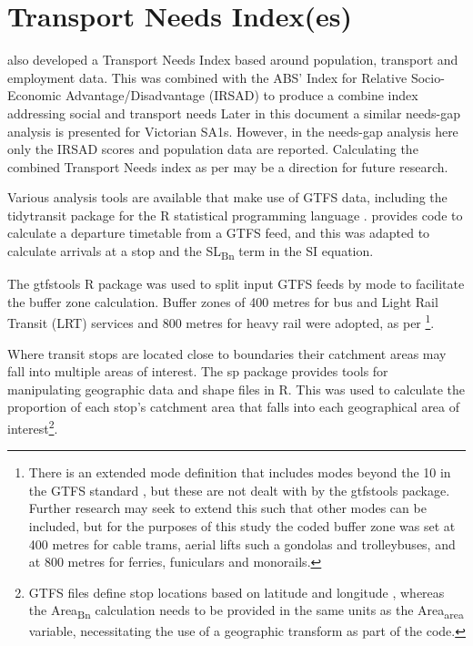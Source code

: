\documentclass[]{tufte-book}
\begin{document}
\hypertarget{transport-needs-indexes}{%
\section{Transport Needs Index(es)}\label{transport-needs-indexes}}

\citet{currie2007identifying} also developed a Transport Needs Index
based around population, transport and employment data. This was
combined with the ABS' Index for Relative Socio-Economic
Advantage/Disadvantage (IRSAD) to produce a combine index addressing
social and transport needs Later in this document a similar needs-gap
analysis is presented for Victorian SA1s. However, in the needs-gap
analysis here only the IRSAD scores and population data are reported.
Calculating the combined Transport Needs index as per
\citet{currie2007identifying} may be a direction for future research.

Various analysis tools are available that make use of GTFS data,
including the tidytransit package \citep{R-tidytransit} for the R
statistical programming language \citep{R-base}.
\citet{tidytransit_departure_timetable} provides code to calculate a
departure timetable from a GTFS feed, and this was adapted to calculate
arrivals at a stop and the SL\textsubscript{Bn} term in the
\citet{currie2007identifying} SI equation.

The gtfstools R package \citep{R-gtfstools} was used to split input GTFS
feeds by mode to facilitate the buffer zone calculation. Buffer zones of
400 metres for bus and Light Rail Transit (LRT) services and 800 metres
for heavy rail were adopted, as per
\citet{currie2007identifying}\footnote{There is an extended mode
  definition that includes modes beyond the 10 in the GTFS standard
  \citep{filter_GTFS_by_mode}, but these are not dealt with by the
  gtfstools package. Further research may seek to extend this such that
  other modes can be included, but for the purposes of this study the
  coded buffer zone was set at 400 metres for cable trams, aerial lifts
  such a gondolas and trolleybuses, and at 800 metres for ferries,
  funiculars and monorails.}.

Where transit stops are located close to boundaries their catchment
areas may fall into multiple areas of interest. The sp package
\citep{R-sf} provides tools for manipulating geographic data and shape
files in R. This was used to calculate the proportion of each stop's
catchment area that falls into each geographical area of
interest\footnote{GTFS files define stop locations based on latitude and
  longitude \citep{GTFS}, whereas the Area\textsubscript{Bn} calculation
  needs to be provided in the same units as the Area\textsubscript{area}
  variable, necessitating the use of a geographic transform as part of
  the code.}.
\end{document}
